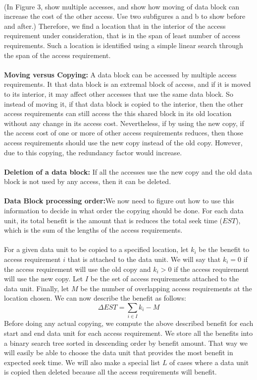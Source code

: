 \documentclass[conference]{acmsiggraph}
\begin{document}
\\
(In Figure 3, show multiple accesses, and show how moving of data block can increase the cost of the other access. Use two subfigures a and b to show before and after.) Therefore, we find a location that in the interior of the access requirement under consideration, that is in the span of least number of access requirements. Such a location is identified using a simple linear search through the span of the access requirement.\\
\\
{\bf Moving versus Copying:} A data block can be accessed by multiple access requirements. It that data block is an extremal block of access, and if it is moved to its interior, it may affect other accesses that use the same data block. So instead of moving it, if that data block is copied to the interior, then the other access requirements can still access the this shared block in its old location without any change in its access cost. Nevertheless, if by using the new copy, if the access cost of one or more of other access requirements reduces, then those access requirements should use the new copy instead of the old copy.  However, due to this copying, the redundancy factor would increase. \\
\\
{\bf  Deletion of a data block:} If all the accesses use the new copy and the old data block is not used by any access, then it can be deleted.\\
\\
{\bf Data Block processing order:}We now need to figure out how to use this information to decide in what order the copying should be done. For each data unit, its total benefit is the amount that is reduces the total seek time ($EST$), which is the sum of the lengths of the access requirements. \\
\\
For a given data unit to be copied to a specified location, let $k_i$ be the benefit to access requirement $i$ that is attached to the data unit. We will say that $k_i=0$ if the access requirement will use the old copy and $k_i>0$ if the access requirement will use the new copy. Let $I$ be the set of access requirements attached to the data unit. Finally, let $M$ be the number of overlapping access requirements at the location chosen. We can now describe the benefit as follows:
\[
\Delta EST = \sum_{i \in I} k_i - M
\]
Before doing any actual copying, we compute the above described benefit for each start and end data unit for each access requirement. We store all the benefits into a binary search tree sorted in descending order by benefit amount. That way we will easily be able to choose the data unit that provides the most benefit in expected seek time. We will also make a special list $L$ of cases where a data unit is copied then deleted because all the access requirements will benefit. \\
\end{document}
